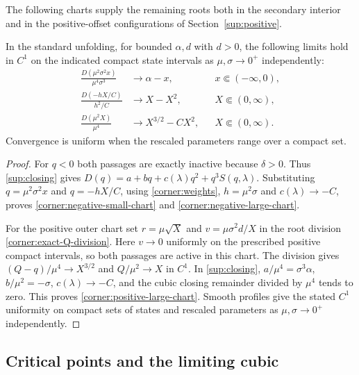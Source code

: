 The following charts supply the remaining roots both in the secondary
interior and in the positive-offset configurations of
Section~\ref{sup:positive}.

\begin{lemma}
\label{corner:realization-charts}
In the standard unfolding, for bounded $\alpha,d$ with $d>0$, the following
limits hold in $C^1$ on the indicated compact
state intervals as $\mu,\sigma\to0^+$ independently:
\begin{align}
 \frac{D(\mu^2\sigma^2x)}{\mu^4\sigma^3}
     &\longrightarrow\alpha-x,
       &&x\Subset(-\infty,0),                         \label{corner:negative-small-chart}\\
 \frac{D(-hX/C)}{h^2/C}
     &\longrightarrow X-X^2,
       &&X\Subset(0,\infty),                          \label{corner:negative-large-chart}\\
 \frac{D(\mu^2X)}{\mu^4}
     &\longrightarrow X^{3/2}-CX^2,
       &&X\Subset(0,\infty).                          \label{corner:positive-large-chart}
\end{align}
Convergence is uniform when the rescaled parameters range over a compact
set.
\end{lemma}

\begin{proof}
For $q<0$ both passages are exactly inactive because $\delta>0$.
Thus \eqref{sup:closing} gives
$D(q)=a+bq+c(\lambda)q^2+q^3S(q,\lambda)$.
Substituting $q=\mu^2\sigma^2x$ and $q=-hX/C$, using
\eqref{corner:weights}, $h=\mu^2\sigma$ and $c(\lambda)\to-C$,
proves \eqref{corner:negative-small-chart} and
\eqref{corner:negative-large-chart}.

For the positive outer chart set $r=\mu\sqrt X$ and
$v=\mu\sigma^2d/X$ in the root division
\eqref{corner:exact-Q-division}. Here $v\to0$ uniformly on the prescribed
positive compact intervals, so both passages are active in this chart. The division gives
$(Q-q)/\mu^4\to X^{3/2}$ and $Q/\mu^2\to X$ in $C^1$.
In \eqref{sup:closing}, $a/\mu^4=\sigma^3\alpha$,
$b/\mu^2=-\sigma$, $c(\lambda)\to-C$, and the cubic closing remainder
divided by $\mu^4$ tends to zero. This proves
\eqref{corner:positive-large-chart}. Smooth profiles give the stated
$C^1$ uniformity on compact sets of states and rescaled parameters as
$\mu,\sigma\to0^+$ independently.
\end{proof}

\subsection{Critical points and the limiting cubic}

